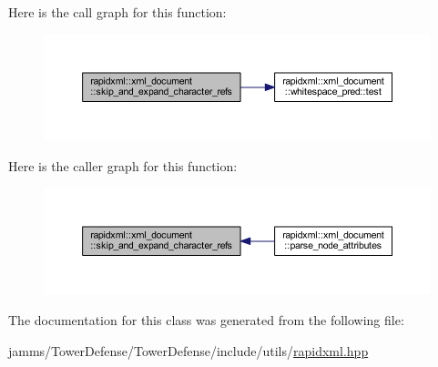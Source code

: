 Here is the call graph for this function\+:
\nopagebreak
\begin{figure}[H]
\begin{center}
\leavevmode
\includegraphics[width=350pt]{singletonrapidxml_1_1xml__document_af86781975cdfff2105fa8c0b49ab4507_cgraph}
\end{center}
\end{figure}




Here is the caller graph for this function\+:
\nopagebreak
\begin{figure}[H]
\begin{center}
\leavevmode
\includegraphics[width=350pt]{singletonrapidxml_1_1xml__document_af86781975cdfff2105fa8c0b49ab4507_icgraph}
\end{center}
\end{figure}




The documentation for this class was generated from the following file\+:\begin{DoxyCompactItemize}
\item 
jamms/\+Tower\+Defense/\+Tower\+Defense/include/utils/\hyperlink{rapidxml_8hpp}{rapidxml.\+hpp}\end{DoxyCompactItemize}
